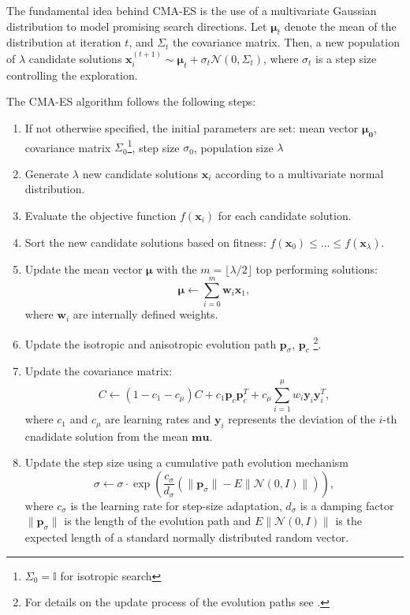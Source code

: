 The fundamental idea behind CMA-ES is the use of a multivariate Gaussian distribution to model promising search directions. 
Let $\mathbf{\mu}_t$ denote the mean of the distribution at iteration $t$, and $\Sigma_t$ the covariance matrix. 
Then, a new population of $\lambda$ candidate solutions $\mathbf{x}_i^{(t+1)} \sim \mathbf{\mu}_t + \sigma_t\mathcal{N}(0, \Sigma_t)$, where $\sigma_t$ is a step size controlling the exploration.  

The CMA-ES algorithm follows the following steps:\begin{enumerate}
    \item If not otherwise specified, the initial parameters are set: mean vector $\mathbf{\mu_0}$, covariance matrix $\Sigma_0$\footnote{$\Sigma_0=\mathbb{I}$ for isotropic search}, step size $\sigma_0$, population size $\lambda$
    \item Generate $\lambda$ new candidate solutions $\mathbf{x}_i$ according to a multivariate normal distribution.
    \item Evaluate the objective function $f(\mathbf{x}_i)$ for each candidate solution.
    \item Sort the new candidate solutions based on fitness: $f(\mathbf{x}_0) \leq ... \leq f(\mathbf{x}_{\lambda})$.
    \item Update the mean vector $\mathbf{\mu}$ with the $m=\lfloor \lambda / 2 \rfloor$ top performing solutions:\begin{equation}
        \mathbf{\mu} \leftarrow \sum_{i=0}^m \mathbf{w}_i\mathbf{x}_1,
    \end{equation} where $\mathbf{w}_i$ are internally defined weights.
    \item Update the isotropic and anisotropic evolution path $\mathbf{p}_{\sigma}$, $\mathbf{p}_c$ \footnote{For details on the update process of the evolution paths see \cite{cmaessimplepractical}.}.
    \item Update the covariance matrix: \begin{equation}
        C \leftarrow (1 - c_1 - c_{\mu}) C + c_1 \mathbf{p}_c \mathbf{p}_c^T + c_{\mu} \sum_{i=1}^{\mu} w_i \mathbf{y}_i \mathbf{y}_i^T,
    \end{equation} where $c_1$ and $c_\mu$ are learning rates and $\mathbf{y}_i$ represents the deviation of the $i$-th cnadidate solution from the mean $\mathbf{mu}$.
    \item Update the step size using a cumulative path evolution mechanism \begin{equation}
        \sigma \leftarrow \sigma \cdot \exp \left( \frac{c_{\sigma}}{d_{\sigma}} \left( \| \mathbf{p}_{\sigma} \| - E \| \mathcal{N}(0, I) \| \right) \right),
    \end{equation} where $c_\sigma$ is the learning rate for step-size adaptation, $d_\sigma$ is a damping factor $\| \mathbf{p}_{\sigma} \|$ is the length of the evolution path and $E \| \mathcal{N}(0, I) \|$ is the expected length of a standard normally distributed random vector.
\end{enumerate}

